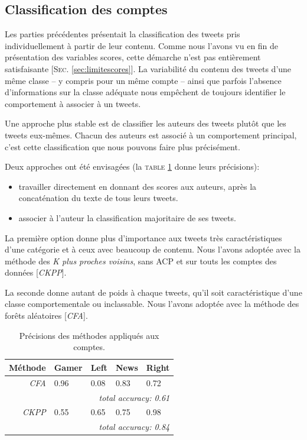 \documentclass[twocolumn,10pt]{article}
\begin{document}
\subsection{Classification des comptes}

Les parties précédentes présentait la classification des tweets pris individuellement à partir de leur contenu. Comme nous l'avons vu en fin de présentation des variables scores, cette démarche n'est pas entièrement satisfaisante [\textsc{Sec.} \ref{sec:limitescores}]. La variabilité du contenu des tweets d'une même classe -- y compris pour un même compte -- ainsi que parfois l'absence d'informations sur la classe adéquate nous empêchent de toujours identifier le comportement à associer à un tweets.

Une approche plus stable est de classifier les auteurs des tweets plutôt que les tweets eux-mêmes. Chacun des auteurs est associé à un comportement principal, c'est cette classification que nous pouvons faire plus précisément.

Deux approches ont été envisagées (la \textsc{table} \ref{tab:PMC} donne leurs précisions):
\begin{itemize}
\item travailler directement en donnant des scores aux auteurs, après la concaténation du texte de tous leurs tweets.
\item associer à l'auteur la classification majoritaire de ses tweets.
\end{itemize}

La première option donne plus d'importance aux tweets très caractéristiques d'une catégorie et à ceux avec beaucoup de contenu. Nous l'avons adoptée avec la méthode des \textit{K plus proches voisins}, sans ACP et sur touts les comptes des données [\textit{CKPP}].

La seconde donne autant de poids à chaque tweets, qu'il soit caractéristique d'une classe comportementale ou inclassable. Nous l'avons adoptée avec la méthode des forêts aléatoires [\textit{CFA}].

\begin{table}[h]
\begin{center}
\noindent\begin{tabular}{r|llll}
Méthode & Gamer & Left & News & Right \\ 
\hline 
\textit{CFA} & 0.96 & 0.08 & 0.83 & 0.72 \\
 & \multicolumn{4}{|r}{\textit{total accuracy: 0.61}} \\
\textit{CKPP} & 0.55 & 0.65 & 0.75 & 0.98 \\
 & \multicolumn{4}{|r}{\textit{total accuracy: 0.84}} \\
\end{tabular}
\caption{\label{tab:PMC} Précisions des méthodes appliqués aux comptes.}
\end{center} 
\end{table}
\end{document}
